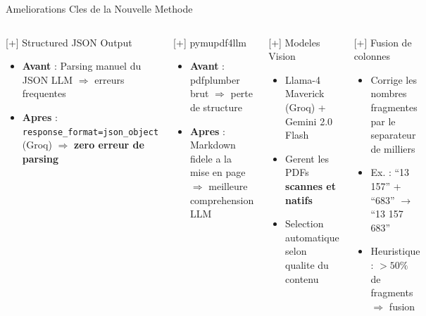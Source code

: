 \documentclass[aspectratio=169, 10pt]{beamer}
\begin{document}
\begin{frame}{Ameliorations Cles de la Nouvelle Methode}
  \begin{columns}[T]
      \begin{block}{[+] Structured JSON Output}
        \begin{itemize}\small
          \item \textbf{Avant} : Parsing manuel du JSON LLM
                $\Rightarrow$ erreurs frequentes
          \item \textbf{Apres} : \texttt{response\_format=json\_object}
                (Groq) $\Rightarrow$ \textbf{zero erreur de parsing}
        \end{itemize}
      \end{block}

      \begin{block}{[+] pymupdf4llm}
        \begin{itemize}\small
          \item \textbf{Avant} : pdfplumber brut
                $\Rightarrow$ perte de structure
          \item \textbf{Apres} : Markdown fidele a la mise en page
                $\Rightarrow$ meilleure comprehension LLM
        \end{itemize}
      \end{block}

      \begin{block}{[+] Modeles Vision}
        \begin{itemize}\small
          \item Llama-4 Maverick (Groq) + Gemini 2.0 Flash
          \item Gerent les PDFs \textbf{scannes et natifs}
          \item Selection automatique selon qualite du contenu
        \end{itemize}
      \end{block}

      \begin{block}{[+] Fusion de colonnes}
        \begin{itemize}\small
          \item Corrige les nombres fragmentes par le separateur
                de milliers
          \item Ex. : ``13 157'' + ``683'' $\rightarrow$ ``13 157 683''
          \item Heuristique : $>50\%$ de fragments $\Rightarrow$ fusion
        \end{itemize}
      \end{block}
  \end{columns}
\end{frame}
\end{document}
